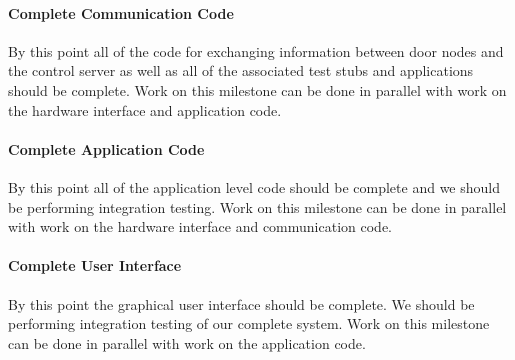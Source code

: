 \paragraph{Complete Communication Code}
By this point all of the code for exchanging information between door
nodes and the control server as well as all of the associated test stubs and
applications should be complete. Work on this milestone can be done in parallel
with work on the hardware interface and application code.

\paragraph{Complete Application Code}
By this point all of the application level code should be complete and we should
be performing integration testing. Work on this milestone can be done in
parallel with work on the hardware interface and communication code.

\paragraph{Complete User Interface}
By this point the graphical user interface should be complete. We should be
performing integration testing of our complete system. Work on this milestone
can be done in parallel with work on the application code.

